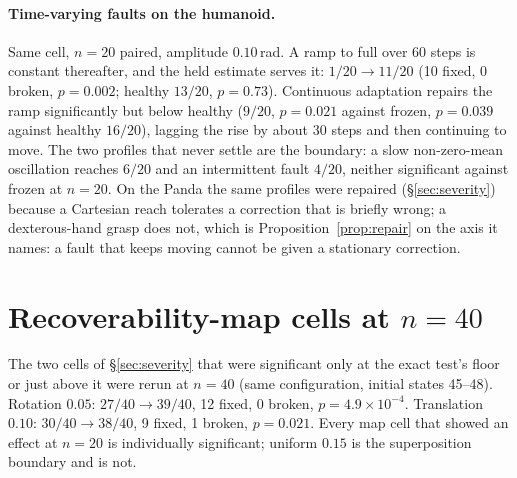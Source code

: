 \documentclass{article}
\begin{document}
\paragraph{Time-varying faults on the humanoid.} Same cell, $n=20$ paired, amplitude
$0.10$\,rad. A ramp to full over 60 steps is constant thereafter, and the held estimate
serves it: $1/20\to11/20$ (10 fixed, 0 broken, $p=0.002$; healthy $13/20$, $p=0.73$).
Continuous adaptation repairs the ramp significantly but below healthy ($9/20$, $p=0.021$
against frozen, $p=0.039$ against healthy $16/20$), lagging the rise by about 30 steps and
then continuing to move. The two profiles that never settle are the boundary: a slow
non-zero-mean oscillation reaches $6/20$ and an intermittent fault $4/20$, neither
significant against frozen at $n=20$. On the Panda the same profiles were repaired
(\S\ref{sec:severity}) because a Cartesian reach tolerates a correction that is briefly
wrong; a dexterous-hand grasp does not, which is Proposition~\ref{prop:repair} on the
axis it names: a fault that keeps moving cannot be given a stationary correction.

\section{Recoverability-map cells at $n=40$}
\label{app:map40}
The two cells of \S\ref{sec:severity} that were significant only at the exact test's floor
or just above it were rerun at $n=40$ (same configuration, initial states 45--48). Rotation
$0.05$: $27/40\to39/40$, 12 fixed, 0 broken, $p=4.9\times10^{-4}$. Translation $0.10$:
$30/40\to38/40$, 9 fixed, 1 broken, $p=0.021$. Every map cell that showed an effect at
$n=20$ is individually significant; uniform $0.15$ is the superposition boundary and is not.
\end{document}
